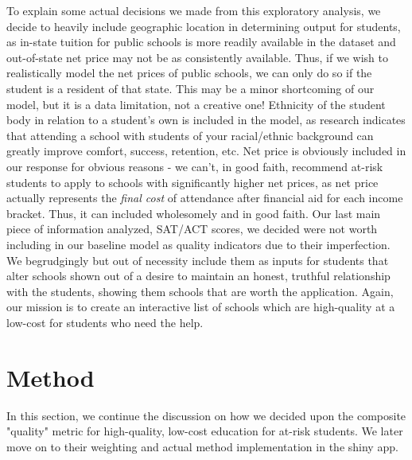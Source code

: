 \documentclass{article}\usepackage[]{graphicx}\usepackage[]{color}
\begin{document}
To explain some actual decisions we made from this exploratory analysis, we decide to heavily include geographic location in determining output for students, as in-state tuition for public schools is more readily available in the dataset and out-of-state net price may not be as consistently available. Thus, if we wish to realistically model the net prices of public schools, we can only do so if the student is a resident of that state. This may be a minor shortcoming of our model, but it is a data limitation, not a creative one! Ethnicity of the student body in relation to a student's own is included in the model, as research indicates that attending a school with students of your racial/ethnic background can greatly improve comfort, success, retention, etc. Net price is obviously included in our response for obvious reasons - we can't, in good faith, recommend at-risk students to apply to schools with significantly higher net prices, as net price actually represents the \emph{final cost} of attendance after financial aid for each income bracket. Thus, it can included wholesomely and in good faith. Our last main piece of information analyzed, SAT/ACT scores, we decided were not worth including in our baseline model as quality indicators due to their imperfection. We begrudgingly but out of necessity include them as inputs for students that alter schools shown out of a desire to maintain an honest, truthful relationship with the students, showing them schools that are worth the application. Again, our mission is to create an interactive list of schools which are high-quality at a low-cost for students who need the help.

\maketitle
\section{Method}

In this section, we continue the discussion on how we decided upon the composite "quality" metric for high-quality, low-cost education for at-risk students. We later move on to their weighting and actual method implementation in the shiny app. \newline
\end{document}

